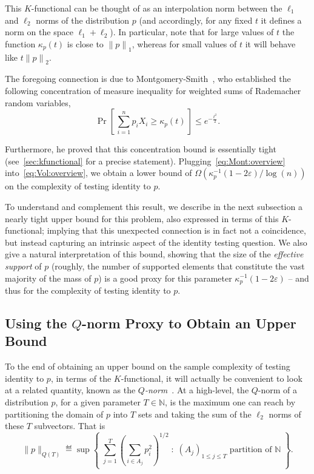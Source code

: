 \documentclass[11pt]{article}
\theoremstyle{remark}   	\newtheorem{remark}[theorem]{Remark}
\theoremstyle{definition}   	\newaliascnt{defn}{theorem}
\newcommand{\eps}{\ensuremath{\varepsilon}\xspace}
\newcommand{\setOfSuchThat}[2]{ \left\{\; #1 \;\colon\; #2\; \right\} } 			\newcommand{\indicSet}[1]{\mathds{1}_{#1}}                                              \newcommand{\indic}[1]{\indicSet{\left\{#1\right\}}}                                             \newcommand{\disjunion}{\amalg}
\newcommand{\proba}{\Pr}
\newcommand{\probaOf}[1]{\proba\!\left[\, #1\, \right]}
\newcommand{\norm}[1]{\lVert#1{\rVert}}
\newcommand{\normone}[1]{{\norm{#1}}_1}
\newcommand{\normtwo}[1]{{\norm{#1}}_2}
\newcommand{\N}{\ensuremath{\mathbb{N}}\xspace}
\newcommand{\lp}[1][1]{\ell_{#1}}
\newcommand{\kf}[1]{\kappa_{#1}}
\begin{document}
This $K$-functional can be thought of as an interpolation norm between the $\lp[1]$ and $\lp[2]$ norms of the distribution $p$ (and accordingly, for any fixed $t$ it defines a norm on the space $\lp[1]+\lp[2]$). In particular, note that for large values of $t$ the function $\kf{p}(t)$ is close to $\normone{p}$, whereas for small values of $t$ it will behave like $t\normtwo{p}$.

The foregoing connection is due to Montgomery-Smith~\cite{MS:90}, who established the following concentration of measure inequality for weighted sums of Rademacher random variables,
\begin{equation}
\label{eq:Mont:overview}
  \probaOf{ \sum_{i=1}^n p_i X_i \geq \kf{p}(t) } \leq e^{-\frac{t^2}{2} }.
\end{equation}

Furthermore, he proved that this concentration bound is essentially tight (see~\autoref{sec:kfunctional} for a precise statement). Plugging~\eqref{eq:Mont:overview} into~\eqref{eq:Vol:overview}, we obtain a lower bound of $\Omega(\kf{p}^{-1}(1-2\eps)/\log(n))$ on the complexity of testing identity to $p$.

To understand and complement this result, we describe in the next subsection a nearly tight upper bound for this problem, also expressed in terms of this $K$-functional; implying that this unexpected connection is in fact not a coincidence, but instead capturing an intrinsic aspect of the identity testing question. We also give a natural interpretation of this bound, showing that the size of the \emph{effective support} of $p$ (roughly, the number of supported elements that constitute the vast majority of the mass of $p$) is a good proxy for this parameter $\kf{p}^{-1}(1-2\eps)$ -- and thus for the complexity of testing identity to $p$.

\subsection{Using the $Q$-norm Proxy to Obtain an Upper Bound}
\label{sec:overview:ub}
To the end of obtaining an upper bound on the sample complexity of testing identity to $p$, in terms of the $K$-functional, it will actually be convenient to look at a related quantity, known as the \emph{$Q$-norm}~\cite{MS:90}. At a high-level, the $Q$-norm of a distribution $p$, for a given parameter $T\in\N$, is the maximum one can reach by partitioning the domain of $p$ into $T$ sets and taking the sum of the $\lp[2]$ norms of these $T$ subvectors. That is
 \[
    \norm{p}_{Q(T)} \eqdef \sup \setOfSuchThat{ \sum_{j=1}^T \left( \sum_{i\in A_j} p_i^2 \right)^{1/2} }{ (A_j)_{1\leq j\leq T} \text{ partition of } \N }.
  \]
\end{document}
